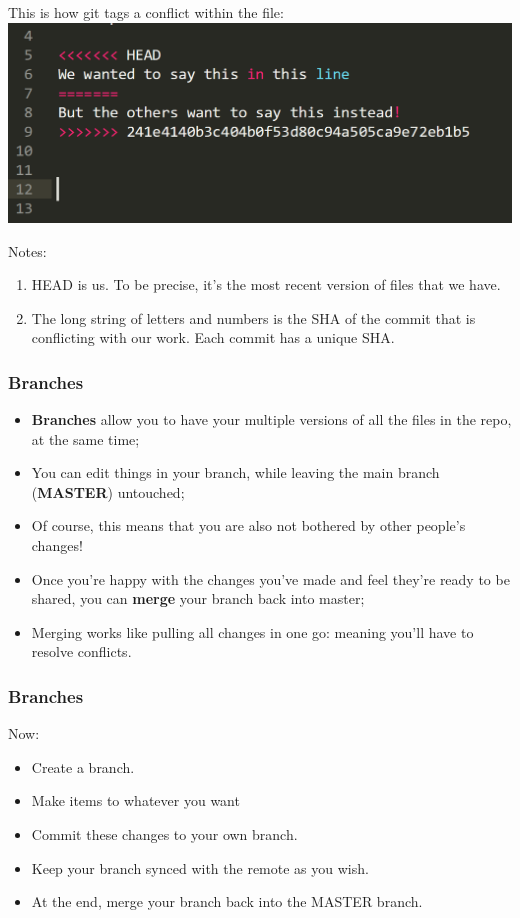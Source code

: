 \documentclass{beamer}
\begin{document}
\begin{frame}
	This is how git tags a conflict within the file:
	\hfill\includegraphics[width=1\linewidth]{figures/conflict.png}\hfill\strut
	Notes:
	\begin{enumerate}
		\item HEAD is us. To be precise, it's the most recent version of files that we have.
		\item The long string of letters and numbers is the SHA of the commit that is conflicting with our work. Each commit has a unique SHA.
	\end{enumerate}
\end{frame}


\begin{frame}
	\frametitle{Branches}
	\begin{itemize}
		\item \textbf{Branches} allow you to have your multiple versions of all the files in the repo, at the same time;
		\item You can edit things in your branch, while leaving the main branch (\textbf{MASTER}) untouched;
		\item Of course, this means that you are also not bothered by other people's changes!
		\item Once you're happy with the changes you've made and feel they're ready to be shared, you can \textbf{merge} your branch back into master;
		\item Merging works like pulling all changes in one go: meaning you'll have to resolve conflicts.
	\end{itemize}
\end{frame}


\begin{frame}
	\frametitle{Branches}
	Now:
	\begin{itemize}
		\item Create a branch.
		\item Make items to whatever you want
		\item Commit these changes to your own branch.
		\item Keep your branch synced with the remote as you wish.
		\item At the end, merge your branch back into the MASTER branch.
	\end{itemize}
\end{frame}
\end{document}
